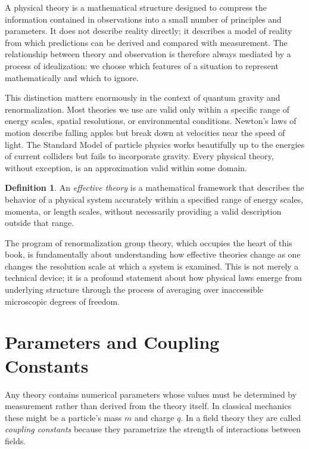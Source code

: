 \documentclass[12pt,a4paper,oneside]{book}
\theoremstyle{definition}
\newtheorem{definition}{Definition}[chapter]
\theoremstyle{plain}
\theoremstyle{remark}
\begin{document}
A physical theory is a mathematical structure designed to compress the
information contained in observations into a small number of principles and
parameters. It does not describe reality directly; it describes a model of
reality from which predictions can be derived and compared with measurement.
The relationship between theory and observation is therefore always mediated by
a process of idealization: we choose which features of a situation to represent
mathematically and which to ignore.

This distinction matters enormously in the context of quantum gravity and
renormalization. Most theories we use are valid only within a specific range of
energy scales, spatial resolutions, or environmental conditions. Newton's laws
of motion describe falling apples but break down at velocities near the speed of
light. The Standard Model of particle physics works beautifully up to the energies
of current colliders but fails to incorporate gravity. Every physical theory,
without exception, is an approximation valid within some domain.

\begin{definition}
An \emph{effective theory} is a mathematical framework that describes the
behavior of a physical system accurately within a specified range of
energy scales, momenta, or length scales, without necessarily providing a valid
description outside that range.
\end{definition}

The program of renormalization group theory, which occupies the heart of this
book, is fundamentally about understanding how effective theories change as one
changes the resolution scale at which a system is examined. This is not merely
a technical device; it is a profound statement about how physical laws emerge
from underlying structure through the process of averaging over inaccessible
microscopic degrees of freedom.

\section{Parameters and Coupling Constants}

Any theory contains numerical parameters whose values must be determined by
measurement rather than derived from the theory itself. In classical mechanics
these might be a particle's mass $m$ and charge $q$. In a field theory they
are called \emph{coupling constants} because they parametrize the strength of
interactions between fields.
\end{document}
